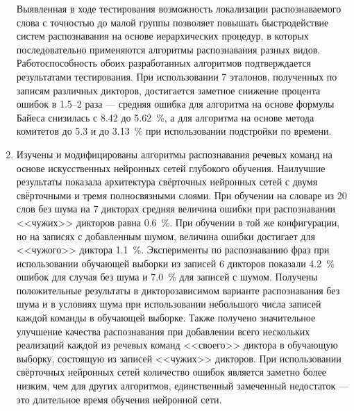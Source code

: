 \begin{enumerate}[label={\arabic*)}]
	Выявленная в ходе тестирования возможность локализации распознаваемого слова с точностью до малой группы позволяет повышать быстродействие систем распознавания на основе иерархических процедур, в которых последовательно применяются алгоритмы распознавания разных видов.
	Работоспособность обоих разработанных алгоритмов подтверждается результатами тестирования.
	При использовании 7 эталонов, полученных по записям различных дикторов, достигается заметное снижение процента ошибок в 1.5--2 раза --- средняя ошибка для алгоритма на основе формулы Байеса снизилась с 8.42 до 5.62~\%, а для алгоритма на основе метода комитетов до 5.3 и до 3.13~\% при использовании подстройки по времени.
	\item Изучены и модифицированы алгоритмы распознавания речевых команд на основе искусственных нейронных сетей глубокого обучения.
	Наилучшие результаты показала архитектура свёрточных нейронных сетей с двумя свёрточными и тремя полносвязными слоями.
	При обучении на словаре из 20 слов без шума на 7 дикторах средняя величина ошибки при распознавании <<чужих>> дикторов равна 0.6~\%.
	При обучении в той же конфигурации, но на записях с добавленным шумом, величина ошибки достигает для <<чужого>> диктора 1.1~\%.
	Эксперименты по распознаванию фраз при использовании обучающей выборки из записей 6 дикторов показали 4.2~\% ошибок для случая без шума и 7.0~\% для записей с шумом.
	Получены положительные результаты в дикторозависимом варианте распознавания без шума и в условиях шума при использовании небольшого числа записей каждой команды в обучающей выборке.
	Также получено значительное улучшение качества распознавания при добавлении всего нескольких реализаций каждой из речевых команд <<своего>> диктора в обучающую выборку, состоящую из записей <<чужих>> дикторов.
	При использовании свёрточных нейронных сетей количество ошибок является заметно более низким, чем для других алгоритмов, единственный замеченный недостаток --- это длительное время обучения нейронной сети.
\end{enumerate}
